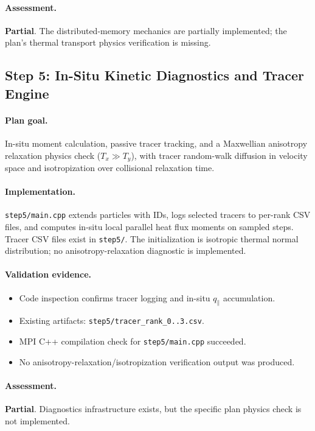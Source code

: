 \documentclass[11pt,a4paper]{article}
\begin{document}
\paragraph{Assessment.}
\textbf{Partial}. The distributed-memory mechanics are partially implemented; the plan's thermal transport physics verification is missing.

\subsection{Step 5: In-Situ Kinetic Diagnostics and Tracer Engine}

\paragraph{Plan goal.}
In-situ moment calculation, passive tracer tracking, and a Maxwellian anisotropy relaxation physics check ($T_x\gg T_y$), with tracer random-walk diffusion in velocity space and isotropization over collisional relaxation time.

\paragraph{Implementation.}
\texttt{step5/main.cpp} extends particles with IDs, logs selected tracers to per-rank CSV files, and computes in-situ local parallel heat flux moments on sampled steps. Tracer CSV files exist in \texttt{step5/}. The initialization is isotropic thermal normal distribution; no anisotropy-relaxation diagnostic is implemented.

\paragraph{Validation evidence.}
\begin{itemize}[leftmargin=*]
  \item Code inspection confirms tracer logging and in-situ $q_\parallel$ accumulation.
  \item Existing artifacts: \texttt{step5/tracer\_rank\_0..3.csv}.
  \item MPI C++ compilation check for \texttt{step5/main.cpp} succeeded.
  \item No anisotropy-relaxation/isotropization verification output was produced.
\end{itemize}

\paragraph{Assessment.}
\textbf{Partial}. Diagnostics infrastructure exists, but the specific plan physics check is not implemented.
\end{document}
